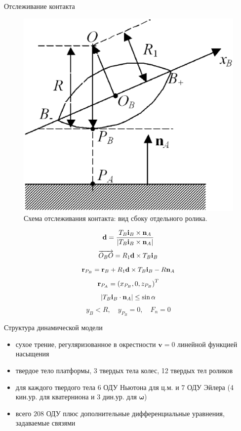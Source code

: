 \documentclass{beamer}
\begin{document}
\begin{frame}{Отслеживание контакта}
        \begin{figure}[htb]
            \centering\includegraphics[width=\textwidth]{content/parts/3_friction/nd/RollerSection.eps}
            \caption{Схема отслеживания контакта: вид сбоку отдельного ролика.}
            \label{ContactScheme}
        \end{figure}
    \endminipage
        $$ {\bf d}=\dfrac{T_B{\bf i}_B\times {\bf n}_A}{\left| T_B{\bf i}_B\times {\bf n}_A\right|} $$
        $$ \overrightarrow{O_BO}=R_1{\bf d}\times T_B{\bf i}_B $$
        $$ {\bf r}_{P_B}={\bf r}_B+R_1{\bf d}\times T_B{\bf i}_B-R{\bf n}_A $$
        $$ {\bf r}_{P_A}=\left( x_{P_B},0,z_{P_B}\right) ^T $$
        $$ \left| T_B{\bf i}_B\cdot {\bf n}_A\right|\le\sin\alpha $$
        $$ y_B<R, \quad y_{P_B}=0, \quad F_n=0 $$
    \endminipage
\end{frame}

\begin{frame}{Структура динамической модели}
    \begin{itemize}
        \item сухое трение, регуляризованное в окрестности $\mathbf{v} = 0$ линейной функцией насыщения
        \item твердое тело платформы, 3 твердых тела колес, 12 твердых тел роликов
        \item для каждого твердого тела 6 ОДУ Ньютона для ц.м. и 7 ОДУ Эйлера (4 кин.ур. для кватерниона и 3 дин.ур. для $\mathbf{\omega}$)
        \item всего $208$ ОДУ плюс дополнительные дифференциальные уравнения, задаваемые связями
    \end{itemize}
\end{frame}
\end{document}
